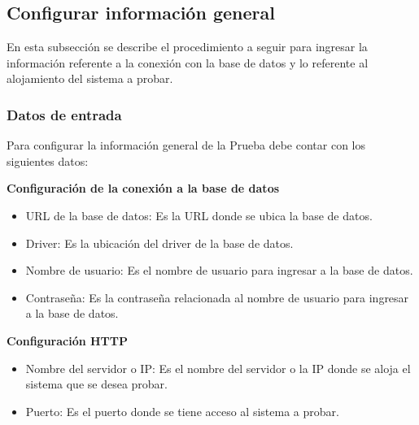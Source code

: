 \subsection{Configurar información general}
En esta subsección se describe el procedimiento a seguir para ingresar la información referente a la conexión con la base de datos y lo referente al alojamiento del sistema a probar.

\subsubsection{Datos de entrada}
\begin{description}
	\item Para configurar la información general de la Prueba debe contar con los siguientes datos: \hspace{10pt}
	
	\begin{description}
	    \item \textbf{Configuración de la conexión a la base de datos}
	    \begin{itemize}
		  \item URL de la base de datos: Es la URL donde se ubica la base de datos.
		  \item Driver: Es la ubicación del driver de la base de datos.
		  \item Nombre de usuario: Es el nombre de usuario para ingresar a la base de datos.
		  \item Contraseña: Es la contraseña relacionada al nombre de usuario para ingresar a la base de datos.
	    \end{itemize}
	    \item \textbf{Configuración HTTP}
	    \begin{itemize}
		  \item Nombre del servidor o IP: Es el nombre del servidor o la IP donde se aloja el sistema que se desea probar.
		  \item Puerto: Es el puerto donde se tiene acceso al sistema a probar.
	    \end{itemize}
	 \end{description}
\end{description}

